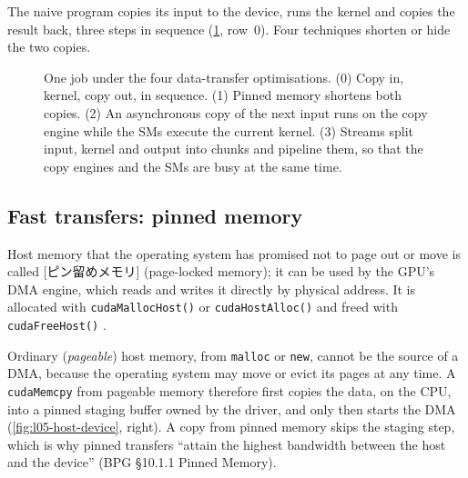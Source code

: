 \documentclass[../main.tex]{subfiles}
\begin{document}
The naive program copies its input to the device, runs the kernel and
copies the result back, three steps in sequence
(\cref{fig:l05-transfer-timelines}, row~0).  Four techniques shorten or
hide the two copies.

\begin{figure}[tb]
  \centering
  
  \caption{One job under the four data-transfer optimisations.  (0)
    Copy in, kernel, copy out, in sequence.  (1) Pinned memory shortens
    both copies.  (2) An asynchronous copy of the next input runs on the
    copy engine while the SMs execute the current kernel.  (3) Streams
    split input, kernel and output into chunks and pipeline them, so
    that the copy engines and the SMs are busy at the same time.}
  \label{fig:l05-transfer-timelines}
\end{figure}

\subsection{Fast transfers: pinned memory}

\begin{definition}
  Host memory that the operating system has promised not to page out or
  move is called [ピン留めメモリ] (page-locked
  memory); it can be used
  by the GPU's DMA engine, which reads and writes it directly by physical
  address.  It is allocated with \texttt{cudaMallocHost()} or
  \texttt{cudaHostAlloc()} and freed with \texttt{cudaFreeHost()}
  \cite{harris2012datatransfer}.
\end{definition}

Ordinary (\emph{pageable}) host memory, from \texttt{malloc} or
\texttt{new}, cannot be the source of a DMA, because the operating system
may move or evict its pages at any time.  A \texttt{cudaMemcpy} from
pageable memory therefore first copies the data, on the CPU, into a
pinned staging buffer owned by the driver, and only then starts the DMA
(\cref{fig:l05-host-device}, right).  A copy from pinned memory skips the
staging step, which is why pinned transfers \enquote{attain the highest
bandwidth between the host and the device} (BPG §10.1.1 Pinned
Memory).
\end{document}
